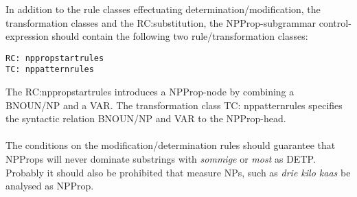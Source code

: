 In addition to the rule classes effectuating determination/modification, the
transformation classes and the RC:substitution, the
NPProp-subgrammar control-expression should contain the following two 
rule/transformation 
classes:
\begin{verbatim}
RC: nppropstartrules
TC: nppatternrules
\end{verbatim}
The RC:nppropstartrules introduces a NPProp-node by combining a BNOUN/NP and a
VAR. The transformation class TC: nppatternrules specifies the syntactic
relation BNOUN/NP and VAR to the NPProp-head. \\ \\
The conditions on the modification/determination rules should guarantee that
NPProps will never dominate substrings with {\em sommige} or {\em most} as
DETP. Probably it should also be prohibited that measure NPs, such as {\em drie
kilo kaas} be analysed as NPProp. 


